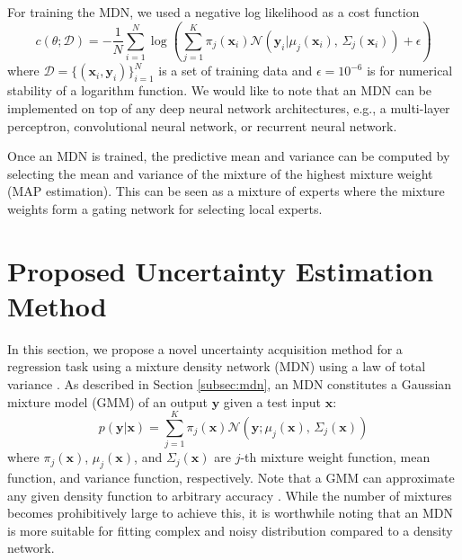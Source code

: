 \documentclass[letterpaper, 10 pt, conference]{ieeeconf}  %
\def\Bx{\mathbf{x}} \def\By{\mathbf{y}} \def\Bp{\mathbf{p}}
\begin{document}
For training the MDN, we used a negative log likelihood 
as a cost function
\begin{equation}
	c(\theta ; \mathcal{D}) = 
		-\frac{1}{N}
		\sum_{i=1}^N
		\log
		(
			\sum_{j=1}^K \pi_j(\Bx_i) 
				\mathcal{N}(\By_i | \mu_j(\Bx_i), \, \Sigma_j(\Bx_i))
			+ \epsilon
		)
\end{equation}
where $\mathcal{D} = \{(\Bx_{i}, \By_{i}) \}_{i=1}^N$
is a set of training data and $\epsilon=10^{-6}$ is for numerical 
stability of a logarithm function. 
We would like to note that an MDN can be implemented 
on top of any deep neural network architectures, 
e.g., a multi-layer perceptron, convolutional neural network, 
or recurrent neural network. 

Once an MDN is trained, the predictive mean and variance 
can be computed by selecting the mean and variance of the
mixture of the highest mixture weight (MAP estimation).
This can be seen as a mixture of experts \cite{Shazeer_17}
where the mixture weights form a gating network for 
selecting local experts. 

\section{Proposed Uncertainty Estimation Method} \label{sec:unct}

In this section, we propose a novel uncertainty acquisition method
for a regression task using a mixture density network (MDN)
using a law of total variance \cite{Duda_73}.
As described in Section \ref{subsec:mdn}, an MDN 
constitutes a Gaussian mixture model (GMM) 
of an output $\mathbf{y}$ 
given a test input $\mathbf{x}$:
\begin{equation} \label{eq:GMM}
	p(\mathbf{y}|\mathbf{x})
		= \sum_{j=1}^{K}\pi_{j}(\mathbf{x})
		\mathcal{N}\left(
			\mathbf{y};\mu_{j}(\mathbf{x}), \, \Sigma_{j}(\mathbf{x})
			\right)
\end{equation}
where $\pi_j(\mathbf{x})$, $\mu_j(\mathbf{x})$, and $ \Sigma_{j}(\mathbf{x}) $
are $j$-th mixture weight function, mean function, and variance function, 
respectively. 
Note that a GMM can approximate any given density function 
to arbitrary accuracy \cite{Mclachlan_88}.
While the number of mixtures becomes prohibitively large
to achieve this, it is worthwhile noting that an MDN is more suitable for fitting
complex and noisy distribution compared to a density network. 
\end{document}
